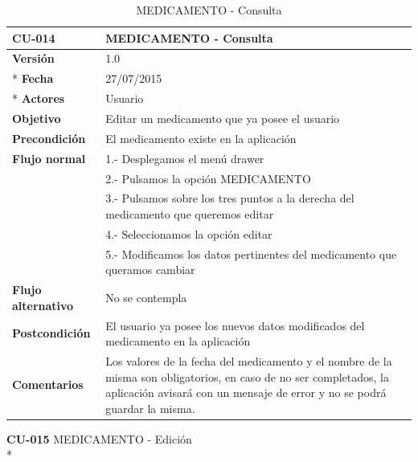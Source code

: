 \documentclass[../pfc.tex]{subfiles}
\begin{document}
		\begin{table}[H]
			\centering
			\begin{tabular}[t]{|p{3cm}|p{9.5cm}|}
				\hline \textbf{CU-014} & \textbf{MEDICAMENTO - Consulta} \\*
				\hline\hline \textbf{Versión} & 1.0 \\ *
				\hline\hline \textbf{Fecha} & 27/07/2015 \\ *
				\hline\textbf{Actores} 	& Usuario\\*
				\hline \textbf{Objetivo} & Editar un medicamento que ya posee el usuario\\* 			
				\hline \textbf{Precondición} & El medicamento existe en la aplicación\\* 
				\hline \textbf{Flujo normal} & 1.- Desplegamos el menú drawer \\* 
				& 2.- Pulsamos la opción MEDICAMENTO\\*	
				& 3.- Pulsamos sobre los tres puntos a la derecha del medicamento que queremos editar\\*	
				& 4.- Seleccionamos la opción editar\\*	
				& 5.- Modificamos los datos pertinentes del medicamento que queramos cambiar\\*	
				\hline \textbf{Flujo alternativo} & No se contempla \\* 
				\hline \textbf{Postcondición} & El usuario ya posee los nuevos datos modificados del medicamento en la aplicación \\* 
				\hline \textbf{Comentarios}   & Los valores de la fecha del medicamento y el nombre de la misma son obligatorios, en caso de no ser completados, la aplicación avisará con un mensaje de error y no se podrá guardar la misma.\\*
				\hline
			\end{tabular}
			\caption{MEDICAMENTO - Consulta}
			\label{tabla:caso014}
		\end{table}
		
		
		
		
		\textbf{CU-015}	MEDICAMENTO - Edición\\*
		
\end{document}
